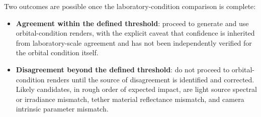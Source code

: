 Two outcomes are possible once the laboratory-condition comparison is complete:

\begin{itemize}
    \item \textbf{Agreement within the defined threshold}: proceed to generate and use orbital-condition renders, with the explicit caveat that confidence is inherited from laboratory-scale agreement and has not been independently verified for the orbital condition itself.
    \item \textbf{Disagreement beyond the defined threshold}: do not proceed to orbital-condition renders until the source of disagreement is identified and corrected. Likely candidates, in rough order of expected impact, are light source spectral or irradiance mismatch, tether material reflectance mismatch, and camera intrinsic parameter mismatch.
\end{itemize}
